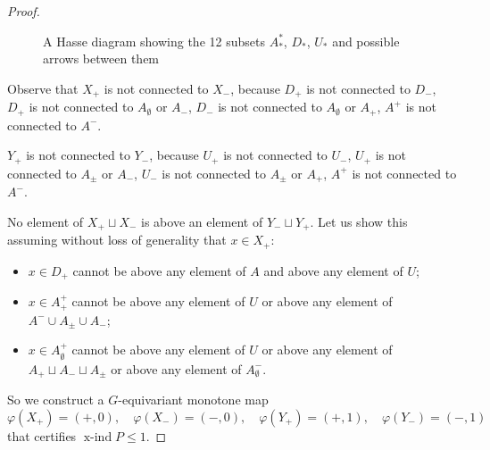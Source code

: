 \documentclass[10pt,a4paper]{amsart}
\renewcommand{\le}{\leqslant}
\renewcommand{\phi}{\varphi}
\DeclareMathOperator{\xind}{x-ind}
\begin{document}
\begin{proof}
\begin{figure}[h!]
\begin{tikzpicture}[
    node style/.style={circle, draw=black, thick, font=\sffamily\bfseries, minimum size=0.8cm, text depth=0pt, align=center}
]
\end{tikzpicture}
    \caption{A Hasse diagram showing the 12 subsets $A_*^*$, $D_*$, $U_*$ and possible arrows between them}
    \label{fig:mu(Z_2)=1}
\end{figure}
    
    Observe that $X_+$ is not connected to $X_-$, because $D_+$ is not connected to $D_-$, $D_+$ is not connected to $A_\emptyset$ or $A_-$, $D_-$ is not connected to $A_\emptyset$ or $A_+$, $A^+$ is not connected to $A^-$.
    
    $Y_+$ is not connected to $Y_-$, because $U_+$ is not connected to $U_-$, $U_+$ is not connected to $A_\pm$ or $A_-$, $U_-$ is not connected to $A_\pm$ or $A_+$, $A^+$ is not connected to $A^-$.
    
    No element of $X_+\sqcup X_-$ is above an element of $Y_-\sqcup Y_+$. Let us show this assuming without loss of generality that $x\in X_+$:
    \begin{itemize}
    \item
    $x\in D_+$ cannot be above any element of $A$ and above any element of $U$;
    \item
    $x\in A_+^+$ cannot be above any element of $U$ or above any element of $A^-\cup A_\pm\cup A_-$;
    \item
    $x\in A_\emptyset^+$ cannot be above any element of $U$ or above any element of $A_+\sqcup A_-\sqcup A_\pm$ or above any element of $A_\emptyset^-$.
    \end{itemize}
    So we construct a $G$-equivariant monotone map
    \[
    \phi(X_+) = (+,0),\quad \phi(X_-) = (-,0),\quad \phi(Y_+) = (+,1),\quad \phi(Y_-) = (-,1)
    \]
    that certifies $\xind P\le 1$.
\end{proof}
\end{document}
